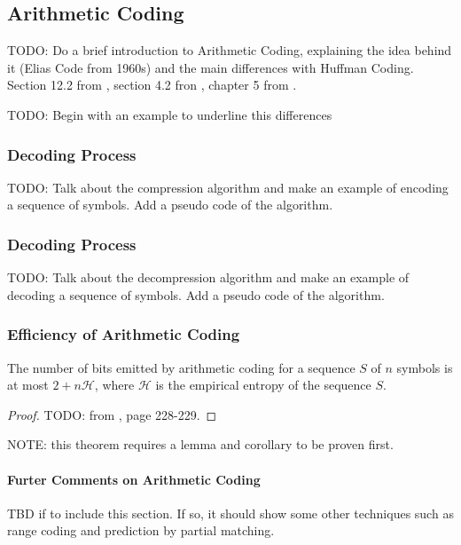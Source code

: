 \subsection{Arithmetic Coding}

TODO: Do a brief introduction to Arithmetic Coding, explaining the idea behind it (Elias Code from 1960s) and the main differences with Huffman Coding. Section 12.2 from \cite{ferragina2023pearls}, section 4.2 fron \cite{han2002mathematics}, chapter 5 from \cite{sayood2002lossless}.

\begin{example}
    TODO: Begin with an example to underline this differences
\end{example}

\subsubsection*{Decoding Process}
TODO: Talk about the compression algorithm and make an example of encoding a sequence of symbols. Add a pseudo code of the algorithm.\\

\subsubsection*{Decoding Process}
TODO: Talk about the decompression algorithm and make an example of decoding a sequence of symbols. Add a pseudo code of the algorithm.\\

\subsubsection*{Efficiency of Arithmetic Coding}
\begin{theorem}
    The number of bits emitted by arithmetic coding for a sequence $S$ of $n$ symbols is at most $2 + n\mathcal{H}$, where $\mathcal{H}$ is the empirical entropy of the sequence $S$.
\end{theorem}
\begin{proof}
    TODO: from \cite{ferragina2023pearls}, page 228-229.
\end{proof}
\noindent NOTE: this theorem requires a lemma and corollary to be proven first.

\paragraph{Furter Comments on Arithmetic Coding} TBD if to include this section. If so, it should show some other techniques such as range coding and prediction by partial matching.
